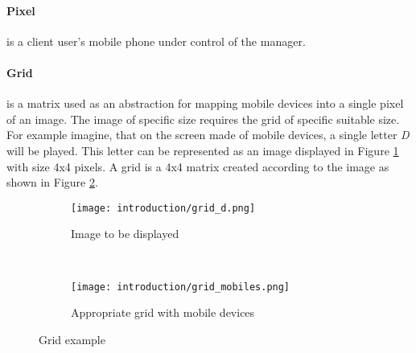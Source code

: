 \paragraph{Pixel} is a client user's mobile phone under control of the manager.

\paragraph{Grid} is a matrix used as an abstraction for mapping mobile devices into a single pixel of an image.
The image of specific size requires the grid of specific suitable size.
For example imagine, that on the screen made of mobile devices, a single letter \emph{D} will be played.
This letter can be represented as an image displayed in Figure \ref{fig:grid_d} with size 4x4 pixels.
A grid is a 4x4 matrix created according to the image as shown in Figure \ref{fig:grid_mobiles}.

\begin{figure}[h]
        \centering
        \begin{subfigure}[b]{0.4\textwidth}
                \texttt{[image: introduction/grid\_d.png]}
                \caption{Image to be displayed}
                \label{fig:grid_d}
        \end{subfigure}
        ~ %
        \begin{subfigure}[b]{0.4\textwidth}
                \texttt{[image: introduction/grid\_mobiles.png]}
                \caption{Appropriate grid with mobile devices}
                \label{fig:grid_mobiles}
        \end{subfigure}
        \caption{Grid example}\label{fig:grid}
\end{figure}